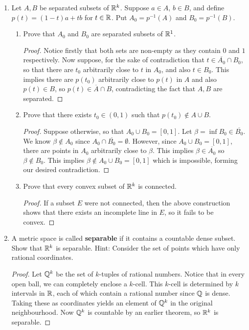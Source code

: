 \begin{enumerate}
\item %
Let $A, B$ be separated subsets of $\mathbb{R}^k$. Suppose $a \in A$, $b \in B$, and define $p(t) = (1 - t)a + tb$ for $t \in \mathbb{R}$. Put $A_0 = p^{-1}(A)$ and $B_0 = p^{-1}(B)$.

\begin{enumerate}
\item Prove that $A_0$ and $B_0$ are separated subsets of $\mathbb{R}^1$. 
\begin{proof}
Notice firstly that both sets are non-empty as they contain $0$ and $1$ respectively. Now suppose, for the sake of contradiction that $t \in \overline{A_0} \cap B_0$, so that there are $t_0$ arbitrarily close to $t$ in $A_0$, and also $t \in B_0$. This implies there are $p(t_0)$ arbitrarily close to $p(t)$ in $A$ and also $p(t) \in B$, so $p(t) \in \overline{A} \cap B$, contradicting the fact that $A, B$ are separated.
\end{proof}
\item Prove that there exists $t_0 \in (0, 1)$ such that $p(t_0) \not\in A \cup B$.
\begin{proof}
Suppose otherwise, so that $A_0 \cup B_0 = [0, 1]$. Let $\beta = \inf B_0 \in \overline{B_0}$. We know $\beta \not\in A_0$ since $A_0 \cap \overline{B_0} = \emptyset$. However, since $A_0 \cup B_0 = [0, 1]$, there are points in $A_0$ arbitrarily close to $\beta$. This implies $\beta \in \overline{A_0}$ so $\beta \not\in B_0$. This implies $\beta \not\in A_0 \cup B_0 = [0, 1]$ which is impossible, forming our desired contradiction.
\end{proof}

\item Prove that every convex subset of $\mathbb{R}^k$ is connected.
\begin{proof}
If a subset $E$ were not connected, then the above construction shows that there exists an incomplete line in $E$, so it fails to be convex.
\end{proof}
\end{enumerate}

\item %
A metric space is called \textbf{separable} if it contains a countable dense subset. Show that $\mathbb{R}^k$ is separable. Hint: Consider the set of points which have only rational coordinates.

\begin{proof}
Let $\mathbb{Q}^k$ be the set of $k$-tuples of rational numbers. Notice that in every open ball, we can completely enclose a $k$-cell. This $k$-cell is determined by $k$ intervals in $\mathbb{R}$, each of which contain a rational number since $\mathbb{Q}$ is dense. Taking these as coordinates yields an element of $\mathbb{Q}^k$ in the original neighbourhood. Now $\mathbb{Q}^k$ is countable by an earlier theorem, so $\mathbb{R}^k$ is separable.
\end{proof}


\end{enumerate}
